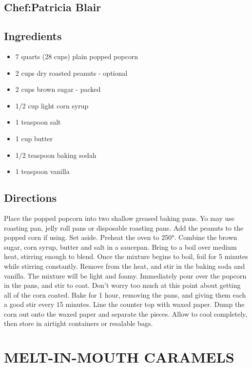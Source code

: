 \documentclass[
]{book}
\providecommand{\tightlist}{%
  \setlength{\itemsep}{0pt}\setlength{\parskip}{0pt}}
\begin{document}
\hypertarget{chefpatricia-blair}{%
\subsection*{Chef:Patricia Blair}\label{chefpatricia-blair}}


\hypertarget{ingredients-97}{%
\subsection*{Ingredients}\label{ingredients-97}}


\begin{itemize}
\tightlist
\item
  7 quarts (28 cups) plain popped popcorn
\item
  2 cups dry roasted peanuts - optional
\item
  2 cups brown sugar - packed
\item
  1/2 cup light corn syrup
\item
  1 teaspoon salt
\item
  1 cup butter
\item
  1/2 teaspoon baking sodah
\item
  1 teaspoon vanilla
\end{itemize}

\hypertarget{directions-97}{%
\subsection*{Directions}\label{directions-97}}


Place the popped popcorn into two shallow greased baking pans. Yo may use roasting pan, jelly roll pans or disposable roasting pans. Add the peanuts to the popped corn if using. Set aside. Preheat the oven to 250°. Combine the brown sugar, corn syrup, butter and salt in a saucepan. Bring to a boil over medium heat, stirring enough to blend. Once the mixture begins to boil, foil for 5 minutes while stirring constantly. Remove from the heat, and stir in the baking soda and vanilla. The mixture will be light and foamy. Immediately pour over the popcorn in the pans, and stir to coat. Don't worry too much at this point about getting all of the corn coated. Bake for 1 hour, removing the pans, and giving them each a good stir every 15 minutes. Line the counter top with waxed paper. Dump the corn out onto the waxed paper and separate the pieces. Allow to cool completely, then store in airtight containers or resalable bags.

\hypertarget{melt-in-mouth-caramels}{%
\section*{MELT-IN-MOUTH CARAMELS}\label{melt-in-mouth-caramels}}
\end{document}
